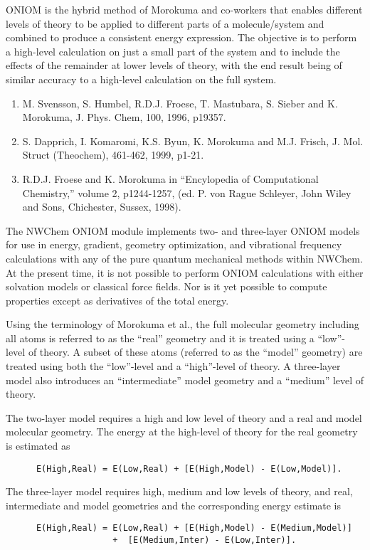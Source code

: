 \label{sec:oniom}

ONIOM is the hybrid method of Morokuma and co-workers that enables
different levels of theory to be applied to different parts of a
molecule/system and combined to produce a consistent energy
expression.  The objective is to perform a high-level calculation on
just a small part of the system and to include the effects of the
remainder at lower levels of theory, with the end result being of
similar accuracy to a high-level calculation on the full system.

\begin{enumerate}
\item M. Svensson, S. Humbel, R.D.J. Froese, T. Mastubara, S. Sieber and
K. Morokuma, J. Phys. Chem, 100, 1996, p19357.
\item  S. Dapprich, I. Komaromi, K.S. Byun, K. Morokuma and M.J. Frisch,
J. Mol. Struct (Theochem), 461-462, 1999, p1-21.
\item R.D.J. Froese and K. Morokuma in ``Encylopedia of Computational Chemistry,'' 
volume 2, p1244-1257, (ed. P. von Rague Schleyer, John Wiley and Sons, 
Chichester, Sussex, 1998).
\end{enumerate}

The NWChem ONIOM module implements two- and three-layer ONIOM models
for use in energy, gradient, geometry optimization, and vibrational
frequency calculations with any of the pure quantum mechanical methods
within NWChem.  At the present time, it is not possible to perform
ONIOM calculations with either solvation models or classical force
fields.  Nor is it yet possible to compute properties except as
derivatives of the total energy.  

Using the terminology of Morokuma et al., the full molecular geometry
including all atoms is referred to as the ``real'' geometry and it is
treated using a ``low''-level of theory.  A subset of these atoms
(referred to as the ``model'' geometry) are treated using both the
``low''-level and a ``high''-level of theory.  A three-layer model
also introduces an ``intermediate'' model geometry and a ``medium''
level of theory.

The two-layer model requires a high and low level of theory and a
real and model molecular geometry.  The energy at the high-level of
theory for the real geometry is estimated as
\begin{verbatim}
      E(High,Real) = E(Low,Real) + [E(High,Model) - E(Low,Model)].
\end{verbatim}
The three-layer model requires high, medium and low levels of theory,
and real, intermediate and model geometries and the corresponding
energy estimate is
\begin{verbatim}
      E(High,Real) = E(Low,Real) + [E(High,Model) - E(Medium,Model)]
                     +  [E(Medium,Inter) - E(Low,Inter)].
\end{verbatim}


